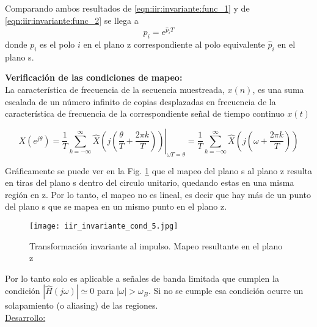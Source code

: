 \documentclass[informe.tex]{subfiles}
\begin{document}
{Comparando ambos resultados de \ref{eqn:iir:invariante:func_1} y de \ref{eqn:iir:invariante:func_2} se llega a
	$$
		p_i=e^{\hat{p}_i T}
	$$
donde $p_i$	 es el polo $i$ en el plano z correspondiente al polo equivalente $\hat{p}_i$ en el plano s.\newline 


\textbf{Verificación de las condiciones de mapeo:}\\
 	
La característica de frecuencia de la secuencia muestreada, $x(n)$, es una suma escalada de un número infinito de copias desplazadas en frecuencia de la característica de frecuencia de la correspondiente señal de tiempo continuo $x(t)$

	$$
		X(e^{j\theta})
		=
		\left.		            
		\frac{1}{T} \sum_{k=-\infty}^{\infty}
		          { \hat{X} \left(
		                 j \left( 
		                       \frac{\theta}
		                             {T}
								+
								\frac{2 \pi k}
		                             {T}		                             
		                  \right)
		           \right)}
		\right |_{\omega T = \theta}
      =
		\frac{1}{T} \sum_{k=-\infty}^{\infty}
		          { \hat{X} \left(
		                 j \left( 
		                       \omega
								+
								\frac{2 \pi k}
		                             {T}		                             
		                  \right)
		           \right)}      
	$$
			
Gráficamente se puede ver en la Fig. \ref{fig:iir:invariante_1_2} que el mapeo del plano s al plano z resulta en tiras del plano s dentro del circulo unitario, quedando estas en una misma región en z. Por lo tanto, el mapeo no es lineal, es decir que hay más de un punto del plano s que se mapea en un mismo punto en el plano z.\newline

	\begin{figure}[h!]
	\centering
	\texttt{[image: iir\_invariante\_cond\_5.jpg]}	
	\caption{Transformación invariante al impulso. Mapeo resultante en el plano z}
	\label{fig:iir:invariante_1_2}
	\end{figure}	

Por lo tanto solo es aplicable a señales de banda limitada que cumplen la condición		
	$ | \hat{H}(j\omega) | \simeq 0  $ para $|\omega|>\omega_B$.
Si no se cumple esa condición ocurre un solapamiento (o aliasing) de las regiones.\\

\underline{Desarrollo:}\\	 

}
\end{document}
